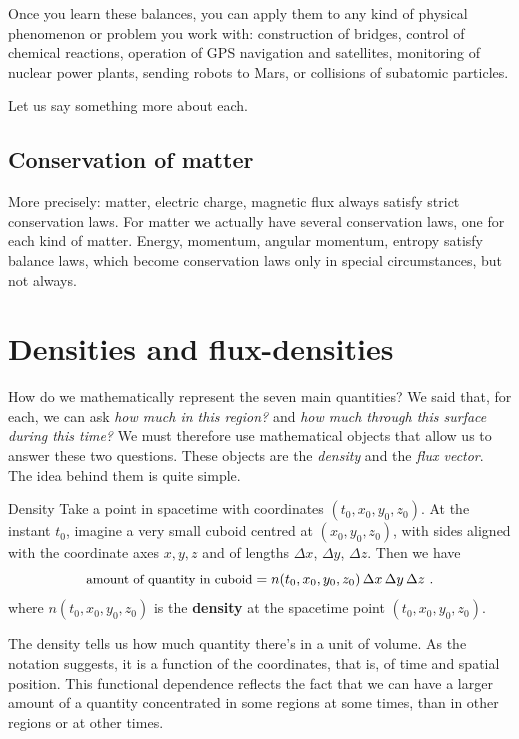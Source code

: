 \documentclass[a4paper,12pt,%
onecolumn,oneside,titlepage,%
british%
]{memoir}
\newcommand*{\incr}{\Delta}%
\renewcommand*{\|}[1][]{\nonscript\:#1\vert\nonscript\:\mathopen{}}
\newcommand*{\yto}{t_{0}}
\newcommand*{\yxo}{x_{0}}
\newcommand*{\yyo}{y_{0}}
\newcommand*{\yzo}{z_{0}}
\newcommand*{\Dx}{\incr x}
\newcommand*{\Dy}{\incr y}
\newcommand*{\Dz}{\incr z}
\begin{document}
\smallskip

Once you learn these balances, you can apply them to any kind of physical phenomenon or problem you work with: construction of bridges, control of chemical reactions, operation of GPS navigation and satellites, monitoring of nuclear power plants, sending robots to Mars, or collisions of subatomic particles.

Let us say something more about each.

\section{Conservation of matter}
\label{sec:cons_matter}





More precisely: matter, electric charge, magnetic flux always satisfy strict conservation laws. For matter we actually have several conservation laws, one for each kind of matter. Energy, momentum, angular momentum, entropy satisfy balance laws, which become conservation laws only in special circumstances, but not always.

\smallskip


\printpagenotes*
\clearpage
\chapter{Densities and flux-densities}
\label{cha:density_fluxdensity}


How do we mathematically represent the seven main quantities? We said that, for each, we can ask \emph{how much in this region?} and \emph{how much through this surface during this time?} We must therefore use mathematical objects that allow us to answer these two questions. These objects are the \emph{density} and the \emph{flux vector}. The idea behind them is quite simple.


\begin{definition}{Density}
  Take a point in spacetime with coordinates $(\yto,\yxo,\yyo,\yzo)$. At the instant $\yto$, imagine a very small cuboid centred at $(\yxo,\yyo,\yzo)$, with sides aligned with the coordinate axes $x,y,z$ and of lengths $\Dx$, $\Dy$, $\Dz$. Then we have
  \begin{equation}
    \label{eq:density_expl}
    \text{\small amount of quantity in cuboid} = 
    n(\yto,\yxo,\yyo,\yzo)\, \Dx\, \Dy\, \Dz \ .
  \end{equation}
  where $n(\yto,\yxo,\yyo,\yzo)$ is the \textbf{density} at the spacetime point $(\yto,\yxo,\yyo,\yzo)$.
\end{definition}
The density tells us how much quantity there's in a unit of volume. As the notation suggests, it is a function of the coordinates, that is, of time and spatial position. This functional dependence reflects the fact that we can have a larger amount of a quantity concentrated in some regions at some times, than in other regions or at other times.
\end{document}
